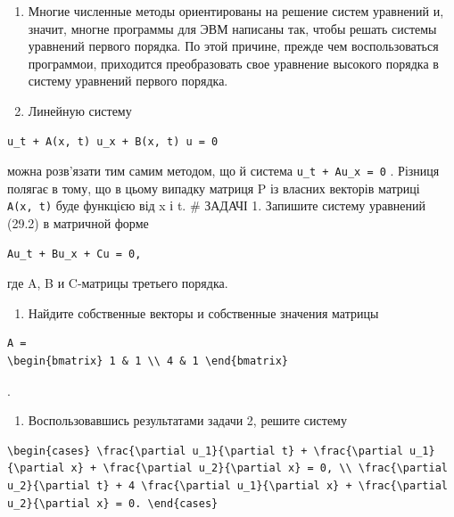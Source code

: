 \documentclass[
  ukrainian,
]{article}
\providecommand{\tightlist}{%
  \setlength{\itemsep}{0pt}\setlength{\parskip}{0pt}}
\begin{document}
\begin{enumerate}
\def\labelenumi{\arabic{enumi}.}
\item
  Многие численные методы ориентированы на решение систем уравнений и,
  значит, многне программы для ЭВМ написаны так, чтобы решать системы
  уравнений первого порядка. По этой причине, прежде чем воспользоваться
  программои, приходится преобразовать свое уравнение высокого порядка в
  систему уравнений первого порядка.
\item
  Линейную систему
\end{enumerate}

\begin{verbatim}
u_t + A(x, t) u_x + B(x, t) u = 0
\end{verbatim}

можна розв'язати тим самим методом, що й система
\texttt{u\_t\ +\ Au\_x\ =\ 0} . Різниця полягає в тому, що в цьому
випадку матриця P із власних векторів матриці \texttt{A(x,\ t)} буде
функцією від x і t. \# ЗАДАЧІ 1. Запишите систему уравнений (29.2) в
матричной форме

\begin{verbatim}
Au_t + Bu_x + Cu = 0,
\end{verbatim}

где A, B и C-матрицы третьего порядка.

\begin{enumerate}
\def\labelenumi{\arabic{enumi}.}
\setcounter{enumi}{1}
\tightlist
\item
  Найдите собственные векторы и собственные значения матрицы
\end{enumerate}

\begin{verbatim}
A =
\begin{bmatrix} 1 & 1 \\ 4 & 1 \end{bmatrix}
\end{verbatim}

.

\begin{enumerate}
\def\labelenumi{\arabic{enumi}.}
\setcounter{enumi}{2}
\tightlist
\item
  Воспользовавшись результатами задачи 2, решите систему
\end{enumerate}

\begin{verbatim}
\begin{cases} \frac{\partial u_1}{\partial t} + \frac{\partial u_1}{\partial x} + \frac{\partial u_2}{\partial x} = 0, \\ \frac{\partial u_2}{\partial t} + 4 \frac{\partial u_1}{\partial x} + \frac{\partial u_2}{\partial x} = 0. \end{cases}
\end{verbatim}
\end{document}
